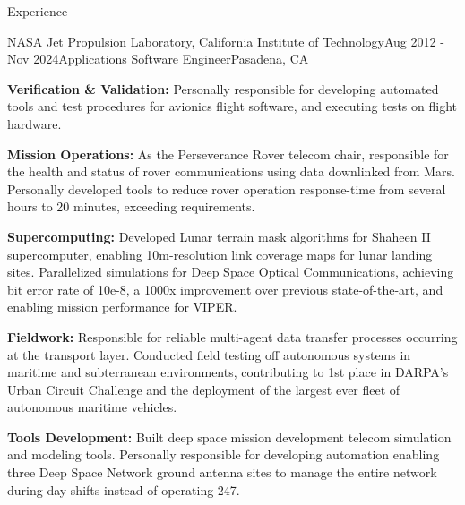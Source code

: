 \documentclass{resume} %
\begin{document}
\begin{rSection}{Experience}
\begin{rSubsection}{NASA Jet Propulsion Laboratory, California Institute of Technology}{Aug 2012 - Nov 2024}{Applications Software Engineer}{Pasadena, CA}


\item {\bf{Verification \& Validation:}} 
Personally responsible for developing automated tools and test procedures for avionics flight software, and executing tests on flight hardware. 


\item {\bf{Mission Operations:}}
As the Perseverance Rover telecom chair, responsible for the health and status of rover communications using data downlinked from Mars. Personally developed tools to reduce rover operation response-time from several hours to 20 minutes, exceeding requirements. 


\item {\bf{Supercomputing:}} 
Developed Lunar terrain mask algorithms for Shaheen II supercomputer, enabling 10m-resolution link coverage maps for lunar landing sites. Parallelized simulations for Deep Space Optical Communications, achieving bit error rate of 10e-8, a 1000x improvement over previous state-of-the-art, and enabling mission performance for VIPER. 
 

\item {\bf{Fieldwork:}} 
Responsible for reliable multi-agent data transfer processes occurring at the transport layer. Conducted field testing off autonomous systems in maritime and subterranean environments, contributing to 1st place in DARPA’s Urban Circuit Challenge and the deployment of the largest ever fleet of autonomous maritime vehicles. 


\item {\bf{Tools Development:}}
Built deep space mission development telecom simulation and modeling tools. Personally responsible for developing automation enabling three Deep Space Network ground antenna sites to manage the entire network during day shifts instead of operating 24\/7.


\end{rSubsection}






\end{rSection}
\end{document}
